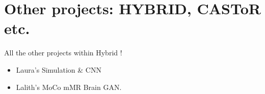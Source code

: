 \chapter{Other projects: HYBRID, CASToR etc.}
All the other projects within Hybrid ! \\
\begin{itemize}
    \item Laura's Simulation \& CNN \\
    \item Lalith's MoCo mMR Brain GAN. \\
\end{itemize}
